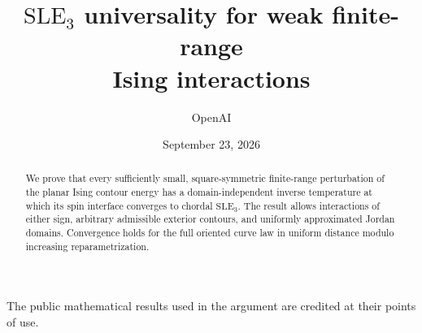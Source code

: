 \documentclass[11pt]{article}
\title{\(\mathrm{SLE}_3\) universality for weak finite-range\\
Ising interactions}
\author{OpenAI}
\date{September 23, 2026}
\theoremstyle{definition}
\theoremstyle{remark}
\numberwithin{equation}{section}
\begin{document}
\maketitle
\begin{abstract}
We prove that every sufficiently small, square-symmetric finite-range
perturbation of the planar Ising contour energy has a domain-independent
inverse temperature at which its spin interface converges to chordal
\(\mathrm{SLE}_3\). The result allows interactions of either sign, arbitrary
admissible exterior contours, and uniformly approximated Jordan domains.
Convergence holds for the full oriented curve law in uniform distance
modulo increasing reparametrization.
\end{abstract}
\tableofcontents
\clearpage







The public mathematical results used in the argument are credited at their points of use.

\let\originalbibsection\bibsection
\renewcommand{\bibsection}{\originalbibsection\addcontentsline{toc}{section}{References}}
\begingroup
\raggedright


\endgroup
\end{document}
